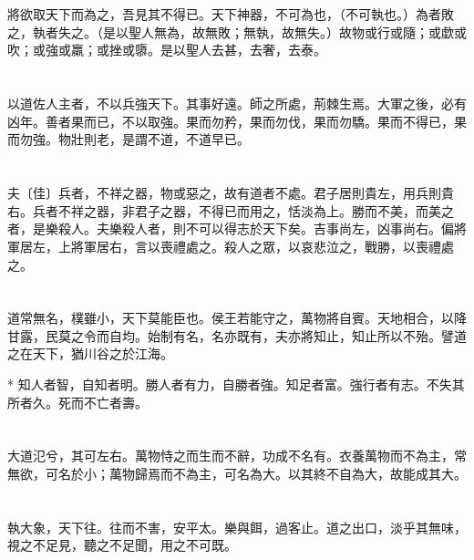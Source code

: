 \documentclass[11pt,oneside]{article}
\begin{document}
\section{}
\label{sec:orgheadline29}
將欲取天下而為之，吾見其不得已。天下神器，不可為也，（不可執也。）為者敗之，執者失之。（是以聖人無為，故無敗；無執，故無失。）故物或行或隨；或歔或吹；或強或羸；或挫或隳。是以聖人去甚，去奢，去泰。

\section{}
\label{sec:orgheadline30}
以道佐人主者，不以兵強天下。其事好遠。師之所處，荊棘生焉。大軍之後，必有凶年。善者果而已，不以取強。果而勿矜，果而勿伐，果而勿驕。果而不得已，果而勿強。物壯則老，是謂不道，不道早已。


\section{}
\label{sec:orgheadline31}
夫〔佳〕兵者，不祥之器，物或惡之，故有道者不處。君子居則貴左，用兵則貴右。兵者不祥之器，非君子之器，不得已而用之，恬淡為上。勝而不美，而美之者，是樂殺人。夫樂殺人者，則不可以得志於天下矣。吉事尚左，凶事尚右。偏將軍居左，上將軍居右，言以喪禮處之。殺人之眾，以哀悲泣之，戰勝，以喪禮處之。

\section{}
\label{sec:orgheadline32}
道常無名，樸雖小，天下莫能臣也。侯王若能守之，萬物將自賓。天地相合，以降甘露，民莫之令而自均。始制有名，名亦既有，夫亦將知止，知止所以不殆。譬道之在天下，猶川谷之於江海。

*
知人者智，自知者明。勝人者有力，自勝者強。知足者富。強行者有志。不失其所者久。死而不亡者壽。

\section{}
\label{sec:orgheadline33}
大道氾兮，其可左右。萬物恃之而生而不辭，功成不名有。衣養萬物而不為主，常無欲，可名於小；萬物歸焉而不為主，可名為大。以其終不自為大，故能成其大。

\section{}
\label{sec:orgheadline34}
執大象，天下往。往而不害，安平太。樂與餌，過客止。道之出口，淡乎其無味，視之不足見，聽之不足聞，用之不可既。
\end{document}
